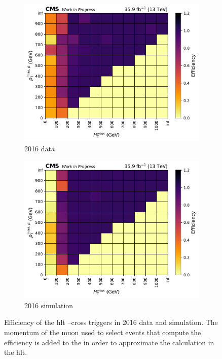 \begin{figure}[htbp]
    \centering
    \begin{subfigure}[b]{0.48\textwidth}
        \includegraphics[width=\textwidth]{figures/trigger_efficiencies/2016/eff-data--n.pdf}
        \caption{2016 data}
    \end{subfigure}
    \hfill
    \begin{subfigure}[b]{0.48\textwidth}
        \includegraphics[width=\textwidth]{figures/trigger_efficiencies/2016/eff-mc--genWeight-sumw.pdf}
        \caption{2016 simulation}
    \end{subfigure}
    \caption[Efficiency of the HLT \ptmiss--\mht cross triggers in 2016 data and simulation]{Efficiency of the \acrshort{hlt} \ptmiss--\mht cross triggers in 2016 data and simulation. The momentum of the muon used to select events that compute the efficiency is added to the \ptmiss in order to approximate the calculation in the \acrlong{hlt}.}
    \label{fig:htoinv_trig_effs_2016}
\end{figure}

